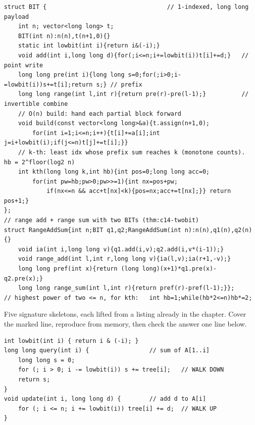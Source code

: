 \begin{lstlisting}[caption={Chapter 18 kit: the plain BIT, the range-add/range-sum pair, and the k-th lift, complete and production-shaped}, label={lst:c14-kit}]
struct BIT {                                  // 1-indexed, long long payload
    int n; vector<long long> t;
    BIT(int n):n(n),t(n+1,0){}
    static int lowbit(int i){return i&(-i);}
    void add(int i,long long d){for(;i<=n;i+=lowbit(i))t[i]+=d;}   // point write
    long long pre(int i){long long s=0;for(;i>0;i-=lowbit(i))s+=t[i];return s;} // prefix
    long long range(int l,int r){return pre(r)-pre(l-1);}          // invertible combine
    // O(n) build: hand each partial block forward
    void build(const vector<long long>&a){t.assign(n+1,0);
        for(int i=1;i<=n;i++){t[i]+=a[i];int j=i+lowbit(i);if(j<=n)t[j]+=t[i];}}
    // k-th: least idx whose prefix sum reaches k (monotone counts). hb = 2^floor(log2 n)
    int kth(long long k,int hb){int pos=0;long long acc=0;
        for(int pw=hb;pw>0;pw>>=1){int nx=pos+pw;
            if(nx<=n && acc+t[nx]<k){pos=nx;acc+=t[nx];}} return pos+1;}
};
// range add + range sum with two BITs (thm:c14-twobit)
struct RangeAddSum{int n;BIT q1,q2;RangeAddSum(int n):n(n),q1(n),q2(n){}
    void ia(int i,long long v){q1.add(i,v);q2.add(i,v*(i-1));}
    void range_add(int l,int r,long long v){ia(l,v);ia(r+1,-v);}
    long long pref(int x){return (long long)(x+1)*q1.pre(x)-q2.pre(x);}
    long long range_sum(int l,int r){return pref(r)-pref(l-1);}};
// highest power of two <= n, for kth:   int hb=1;while(hb*2<=n)hb*=2;
\end{lstlisting}


Five signature skeletons, each lifted from a listing already in the chapter.
Cover the marked line, reproduce from memory, then check the answer one line
below.

\begin{lstlisting}[caption={Drill 1 -- prefix query + point update (from lst:c14-query / lst:c14-update)}]
int lowbit(int i) { return i & (-i); }
long long query(int i) {                 // sum of A[1..i]
    long long s = 0;
    for (; i > 0; i -= lowbit(i)) s += tree[i];   // WALK DOWN
    return s;
}
void update(int i, long long d) {        // add d to A[i]
    for (; i <= n; i += lowbit(i)) tree[i] += d;  // WALK UP
}
\end{lstlisting}

